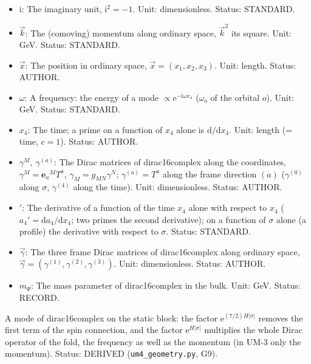 \documentclass[
  10pt,
]{article}
\begin{document}
\begin{itemize}
  (a 16-component spinor function of \(\sigma\)); as a four-dimensional
  field, \(\chi\) denotes the particle of the level of dirac16complex at
  the fold (a long-lived resonance) and \(\bar\chi\) its antiparticle.
  Unit: GeV\(^{2}\) (with the \(V_*\) normalisation). Status: DERIVED.
\item
  \(\mathrm{i}\): The imaginary unit, \(\mathrm{i}^2 = -1\). Unit:
  dimensionless. Status: STANDARD.
\item
  \(\vec k\): The (comoving) momentum along ordinary space, \(\vec k^2\)
  its square. Unit: GeV. Status: STANDARD.
\item
  \(\vec x\): The position in ordinary space,
  \(\vec x = (x_1, x_2, x_3)\). Unit: length. Status: AUTHOR.
\item
  \(\omega\): A frequency: the energy of a mode
  \(\propto \mathrm{e}^{-\mathrm{i}\omega x_4}\) (\(\omega_o\) of the
  orbital \(o\)). Unit: GeV. Status: STANDARD.
\item
  \(x_4\): The time; a prime on a function of \(x_4\) alone is
  \(\mathrm{d}/\mathrm{d}x_4\). Unit: length (= time, \(c = 1\)).
  Status: AUTHOR.
\item
  \(\gamma^M,\ \gamma^{(a)}\): The Dirac matrices of dirac16complex
  along the coordinates, \(\gamma^M = \mathbf{e}_a{}^MT^a\),
  \(\gamma_M = g_{MN}\gamma^N\); \(\gamma^{(a)} = T^a\) along the frame
  direction \((a)\) (\(\gamma^{(0)}\) along \(\sigma\), \(\gamma^{(4)}\)
  along the time). Unit: dimensionless. Status: AUTHOR.
\item
  \({}'\): The derivative of a function of the time \(x_4\) alone with
  respect to \(x_4\) (\(a_4' = \mathrm{d}a_4/\mathrm{d}x_4\); two primes
  the second derivative); on a function of \(\sigma\) alone (a profile)
  the derivative with respect to \(\sigma\). Status: STANDARD.
\item
  \(\vec\gamma\): The three frame Dirac matrices of dirac16complex along
  ordinary space,
  \(\vec\gamma = (\gamma^{(1)}, \gamma^{(2)}, \gamma^{(3)})\). Unit:
  dimensionless. Status: AUTHOR.
\item
  \(m_\Psi\): The mass parameter of dirac16complex in the bulk. Unit:
  GeV. Status: RECORD.
\end{itemize}

A mode of dirac16complex on the static block: the factor
\(\mathrm{e}^{(7/2)H\lvert\sigma\rvert}\) removes the first term of the
spin connection, and the factor \(\mathrm{e}^{H\lvert\sigma\rvert}\)
multiplies the whole Dirac operator of the fold, the frequency as well
as the momentum (in UM-3 only the momentum). Status: DERIVED
(\texttt{um4\_geometry.py}, G9).
\end{document}
